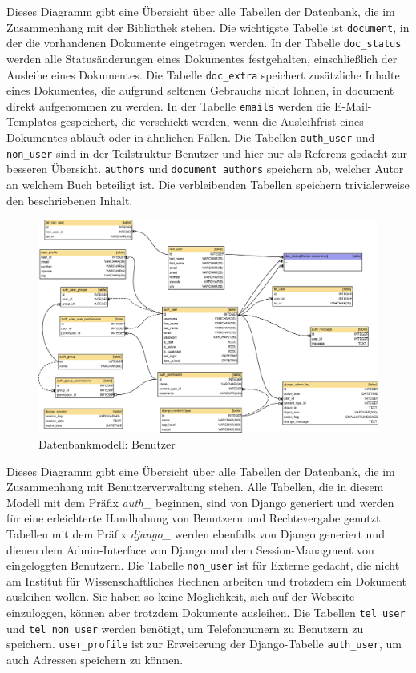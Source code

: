 Dieses Diagramm gibt eine Übersicht über alle Tabellen der Datenbank, die im
Zusammenhang mit der Bibliothek stehen. Die wichtigste Tabelle ist
\lstinline{document}, in der die vorhandenen Dokumente eingetragen werden. In
der Tabelle \lstinline{doc_status} werden alle Statusänderungen eines Dokumentes
festgehalten, einschließlich der Ausleihe eines Dokumentes. Die Tabelle
\lstinline{doc_extra} speichert zusätzliche Inhalte eines Dokumentes, die aufgrund
seltenen Gebrauchs nicht lohnen, in document direkt aufgenommen zu werden. In
der Tabelle \lstinline{emails} werden die E-Mail-Templates gespeichert, die verschickt
werden, wenn die Ausleihfrist eines Dokumentes abläuft oder in ähnlichen
Fällen. Die Tabellen \lstinline{auth_user} und \lstinline{non_user} sind in der Teilstruktur Benutzer
und hier nur als Referenz gedacht zur besseren Übersicht. \lstinline{authors}
und \lstinline{document_authors} speichern ab, welcher Autor an welchem Buch
beteiligt ist. Die verbleibenden Tabellen speichern trivialerweise den beschriebenen Inhalt.


\begin{figure}[H]
\includegraphics[width=1.0\linewidth]{bilder/database-wirelib_cluster-user.pdf}
\caption{Datenbankmodell: Benutzer}
\label{fig:DB_UserDiagramm}
\end{figure}

Dieses Diagramm gibt eine Übersicht über alle Tabellen der Datenbank, die im
Zusammenhang mit Benutzerverwaltung stehen. Alle Tabellen, die in diesem Modell
mit dem Präfix \emph{auth\_} beginnen, sind von Django generiert und werden für
eine erleichterte Handhabung von Benutzern und Rechtevergabe genutzt. Tabellen
mit dem Präfix \emph{django\_} werden ebenfalls von Django generiert und dienen
dem Admin-Interface von Django und dem Session-Managment von eingeloggten
Benutzern. Die Tabelle \lstinline{non_user} ist für Externe gedacht, die nicht
am Institut für Wissenschaftliches Rechnen arbeiten und trotzdem ein Dokument
ausleihen wollen. Sie haben so keine Möglichkeit, sich auf der Webseite
einzuloggen, können aber trotzdem Dokumente ausleihen. Die Tabellen
\lstinline{tel_user} und \lstinline{tel_non_user} werden benötigt, um
Telefonnumern zu Benutzern zu speichern.  \lstinline{user_profile} ist zur
Erweiterung der Django-Tabelle \lstinline{auth_user}, um auch Adressen
speichern zu können.

